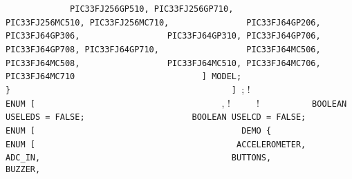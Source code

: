 {{{{\lstinline!             PIC33FJ256GP510, PIC33FJ256GP710,  ! \newline
\lstinline!             PIC33FJ256MC510, PIC33FJ256MC710,  ! \newline
\lstinline!             PIC33FJ64GP206, PIC33FJ64GP306,    ! \newline
\lstinline!             PIC33FJ64GP310, PIC33FJ64GP706,    ! \newline
\lstinline!             PIC33FJ64GP708, PIC33FJ64GP710,    ! \newline
\lstinline!             PIC33FJ64MC506, PIC33FJ64MC508,    ! \newline
\lstinline!             PIC33FJ64MC510, PIC33FJ64MC706,    ! \newline
\lstinline!             PIC33FJ64MC710                     ! \newline
\lstinline!	   ] MODEL;                             ! \newline
\lstinline!	 }                                      ! \newline
\lstinline!      ] !;               ! \newline
\lstinline!                                             ! \newline
\lstinline!      ENUM [                                 ! \newline
\lstinline!	   !\quad \quad{},    ! \newline
\lstinline!	   !\quad \quad{} {    ! \newline
\lstinline!          BOOLEAN USELEDS = FALSE;           ! \newline
\lstinline!          BOOLEAN USELCD = FALSE;            ! \newline
\newline						
\lstinline!          ENUM [                             ! \newline
\lstinline!            DEMO {                           ! \newline
\lstinline!               ENUM [                        ! \newline
\lstinline!                ACCELEROMETER,               ! \newline
\lstinline!                ADC_IN,                      ! \newline
\lstinline!                BUTTONS,                     ! \newline
\lstinline!                BUZZER,                      ! \newline
}}}}}
